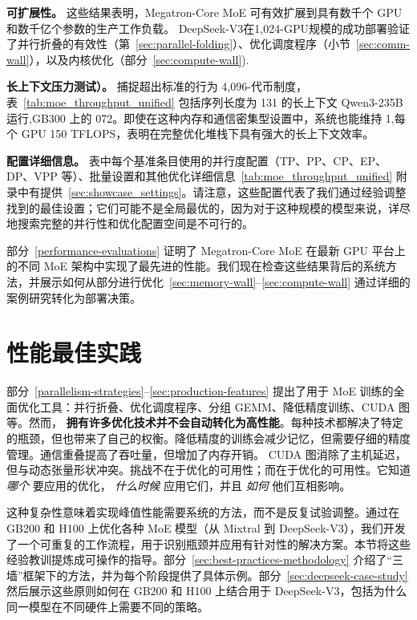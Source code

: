 \textbf{可扩展性。}
这些结果表明，Megatron-Core MoE 可有效扩展到具有数千个 GPU 和数千亿个参数的生产工作负载。 DeepSeek-V3在1,024-GPU规模的成功部署验证了并行折叠的有效性（第~\ref{sec:parallel-folding}）、优化调度程序（小节~\ref{sec:comm-wall}），以及内核优化（部分~\ref{sec:compute-wall}).

\textbf{长上下文压力测试）。}
捕捉超出标准的行为 4{,}096-代币制度，表~\ref{tab:moe_throughput_unified} 包括序列长度为 131 的长上下文 Qwen3-235B 运行{,}GB300 上的 072。即使在这种内存和通信密集型设置中，系统也能维持 1{,}每个 GPU 150 TFLOPS，表明在完整优化堆栈下具有强大的长上下文效率。

\noindent
\textbf{配置详细信息。} 表中每个基准条目使用的并行度配置（TP、PP、CP、EP、DP、VPP 等）、批量设置和其他优化详细信息~\ref{tab:moe_throughput_unified} 附录中有提供~\ref{sec:showcase_settings}。请注意，这些配置代表了我们通过经验调整找到的最佳设置；它们可能不是全局最优的，因为对于这种规模的模型来说，详尽地搜索完整的并行性和优化配置空间是不可行的。

部分~\ref{performance-evaluations} 证明了 Megatron-Core MoE 在最新 GPU 平台上的不同 MoE 架构中实现了最先进的性能。我们现在检查这些结果背后的系统方法，并展示如何从部分进行优化~\ref{sec:memory-wall}--\ref{sec:compute-wall} 通过详细的案例研究转化为部署决策。

\section{性能最佳实践}\label{sec:best-practices}

部分~\ref{parallelism-strategies}--\ref{sec:production-features} 提出了用于 MoE 训练的全面优化工具：并行折叠、优化调度程序、分组 GEMM、降低精度训练、CUDA 图等。然而， \textbf{拥有许多优化技术并不会自动转化为高性能}。每种技术都解决了特定的瓶颈，但也带来了自己的权衡。降低精度的训练会减少记忆，但需要仔细的精度管理。通信重叠提高了吞吐量，但增加了内存开销。 CUDA 图消除了主机延迟，但与动态张量形状冲突。挑战不在于优化的可用性；而在于优化的可用性。它知道 \emph{哪个} 要应用的优化， \emph{什么时候} 应用它们，并且 \emph{如何} 他们互相影响。

这种复杂性意味着实现峰值性能需要系统的方法，而不是反复试验调整。通过在 GB200 和 H100 上优化各种 MoE 模型（从 Mixtral 到 DeepSeek-V3），我们开发了一个可重复的工作流程，用于识别瓶颈并应用有针对性的解决方案。本节将这些经验教训提炼成可操作的指导。部分~\ref{sec:best-practices-methodology} 介绍了“三墙”框架下的方法，并为每个阶段提供了具体示例。部分~\ref{sec:deepseek-case-study} 然后展示这些原则如何在 GB200 和 H100 上结合用于 DeepSeek-V3，包括为什么同一模型在不同硬件上需要不同的策略。

